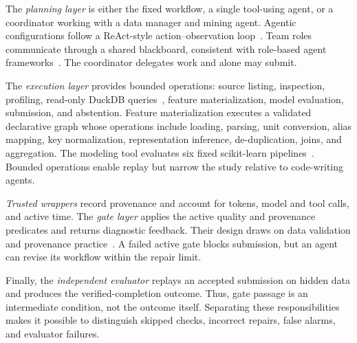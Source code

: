 \documentclass[conference]{IEEEtran}
\begin{document}
The \emph{planning layer} is either the fixed workflow, a single tool-using agent, or a coordinator working with a data manager and mining agent. Agentic configurations follow a ReAct-style action--observation loop~\cite{yao2023react}. Team roles communicate through a shared blackboard, consistent with role-based agent frameworks~\cite{wu2023autogen,hong2024metagpt}. The coordinator delegates work and alone may submit.

The \emph{execution layer} provides bounded operations: source listing, inspection, profiling, read-only DuckDB queries~\cite{raasveldt2019duckdb}, feature materialization, model evaluation, submission, and abstention. Feature materialization executes a validated declarative graph whose operations include loading, parsing, unit conversion, alias mapping, key normalization, representation inference, de-duplication, joins, and aggregation. The modeling tool evaluates six fixed scikit-learn pipelines~\cite{pedregosa2011sklearn}. Bounded operations enable replay but narrow the study relative to code-writing agents.

\emph{Trusted wrappers} record provenance and account for tokens, model and tool calls, and active time. The \emph{gate layer} applies the active quality and provenance predicates and returns diagnostic feedback. Their design draws on data validation and provenance practice~\cite{polyzotis2019datavalidation,schelter2018deequ,w3c2013provdm}. A failed active gate blocks submission, but an agent can revise its workflow within the repair limit.

Finally, the \emph{independent evaluator} replays an accepted submission on hidden data and produces the verified-completion outcome. Thus, gate passage is an intermediate condition, not the outcome itself. Separating these responsibilities makes it possible to distinguish skipped checks, incorrect repairs, false alarms, and evaluator failures.
\end{document}
